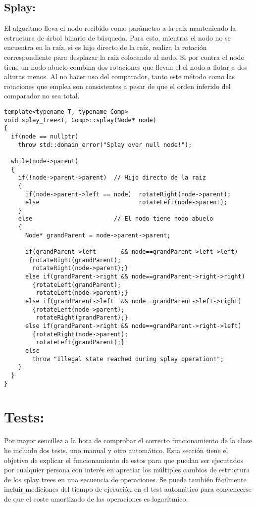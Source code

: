 \documentclass[letterpaper,12pt]{article}
\begin{document}
\subsection{Splay:}

El algoritmo lleva el nodo recibido como parámetro a la raiz manteniendo la
estructura de árbol binario de búsqueda. Para esto, mientras el nodo no se
encuentra en la raíz, si es hijo directo de la raíz, realiza la rotación 
correspondiente para desplazar la raiz colocando al nodo. Si por contra el
nodo tiene un nodo abuelo combina dos rotaciones que llevan el el nodo a 
flotar a dos alturas menos. Al no hacer uso del comparador, tanto este método
como las rotaciones que emplea son consistentes a pesar de que el orden 
inferido del comparador no sea total.


\begin{lstlisting}
template<typename T, typename Comp>
void splay_tree<T, Comp>::splay(Node* node)
{
  if(node == nullptr)
    throw std::domain_error("Splay over null node!");

  while(node->parent)
  {
    if(!node->parent->parent)  // Hijo directo de la raiz
    {
      if(node->parent->left == node)  rotateRight(node->parent);
      else                            rotateLeft(node->parent);
    }
    else                       // El nodo tiene nodo abuelo
    {
      Node* grandParent = node->parent->parent;

      if(grandParent->left       && node==grandParent->left->left)
       {rotateRight(grandParent);
        rotateRight(node->parent);}
      else if(grandParent->right && node==grandParent->right->right)
        {rotateLeft(grandParent);
         rotateLeft(node->parent);}
      else if(grandParent->left  && node==grandParent->left->right)
        {rotateLeft(node->parent);
         rotateRight(grandParent);}
      else if(grandParent->right && node==grandParent->right->left)
        {rotateRight(node->parent);
         rotateLeft(grandParent);}
      else
        throw "Illegal state reached during splay operation!";
    }
  }
}
\end{lstlisting}

\section{Tests:}
Por mayor sencillez a la hora de comprobar el correcto funcionamiento de la 
clase he incluido dos tests, uno manual y otro automático. Esta sección tiene
el objetivo de explicar el funcionamiento de estos para que puedan ser 
ejecutados por cualquier persona con interés en apreciar los múltiples cambios
de estructura de los splay trees en una secuencia de operaciones. Se puede
también fácilmente incluir mediciones del tiempo de ejecución en el test 
automático para convencerse de que el coste amortizado de las operaciones es 
logarítmico.
\end{document}
